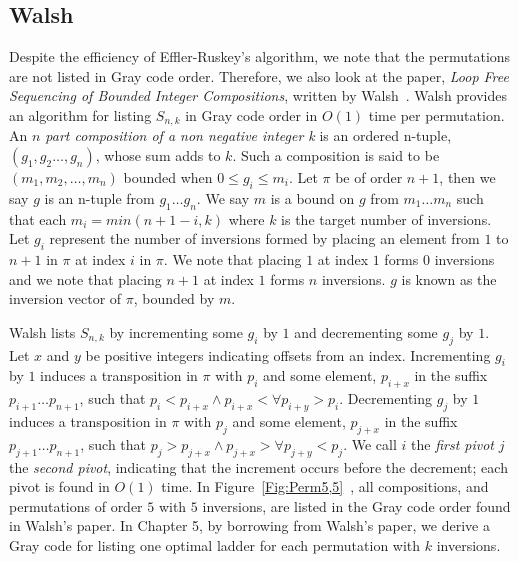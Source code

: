 \subsection{Walsh} 
Despite the efficiency of Effler-Ruskey's algorithm, we note that the permutations are not listed in Gray code order. Therefore, we 
also look at the paper, \emph{Loop Free Sequencing of Bounded Integer Compositions}, written by Walsh~\cite{A41}. Walsh provides an algorithm for listing 
$S_{n,k}$ in Gray code order in $O(1)$ time per permutation.  
An \emph{$n$ part composition of a non negative integer k} is an ordered n-tuple, $(g_{1},g_{2}  \dots ,g_{n})$, whose 
sum adds to $k$.
Such a composition is said to be $(m_{1},m_{2}, \dots, m_{n})$ bounded when $0 \leq g_{i} \leq m_{i}$. Let $\pi$ be 
of order $n+1$, then we say $g$ is an n-tuple from $g_{1} \dots g_{n}$. We say $m$ is a bound on $g$ from 
$m_{1} \dots m_{n}$ such that each $m_{i}=min(n+1 - i, k)$ where $k$ is the target number of 
inversions. Let $g_{i}$ represent the 
number of inversions formed by placing an element from $1$ to $n+1$ in $\pi$ 
at index $i$ in $\pi$. We note that placing $1$ at index $1$ forms $0$ inversions and we note that 
placing $n+1$ at index $1$ forms $n$ inversions. $g$ is known as the inversion vector of $\pi$, bounded by $m$.\par 
Walsh lists $S_{n,k}$ by incrementing some $g_{i}$ by $1$ and decrementing some $g_{j}$ by $1$. Let $x$ and $y$ be positive integers indicating 
offsets from an index. Incrementing $g_{i}$ 
by $1$ induces a transposition in $\pi$ with $p_{i}$ and some element, $p_{i+x}$ in the suffix $p_{i+1} \dots p_{n+1}$, such that 
$p_{i} < p_{i+x} \wedge p_{i+x} < \forall p_{i+y}>p_{i}$. Decrementing $g_{j}$ by $1$ induces a transposition in 
$\pi$ with $p_{j}$ and some element, $p_{j+x}$ in the suffix $p_{j+1} \dots p_{n+1}$, such that $p_{j} > p_{j+x} \wedge p_{j+x} > \forall p_{j+y}<p_{j}$. 
We call $i$ the \emph{first pivot} $j$ the \emph{second pivot}, indicating that the increment occurs before the decrement; each pivot is found in 
$O(1)$ time. In Figure~\ref{Fig:Perm5,5}~\cite{A41}, all compositions, and permutations of order $5$ with $5$ inversions, are listed in the Gray code order 
found in Walsh's paper. In Chapter 5, by borrowing from Walsh's paper, we derive a Gray code for listing one optimal ladder for each 
permutation with $k$ inversions. 
